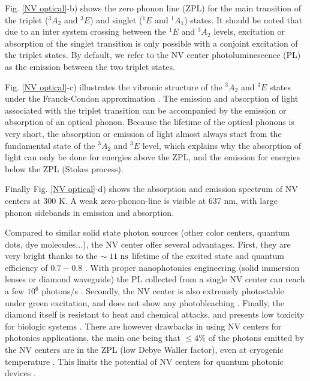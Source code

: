 \documentclass[a4paper,11pt]{report}
\begin{document}
Fig. \ref{NV optical}-b) shows the zero phonon line (ZPL) for the main transition of the triplet ($^3A_2$ and $^3E$) and singlet ($^1E$ and $^1A_1$) states. It should be noted that due to an inter system crossing between the $^1E$ and $^3A_2$ levels, excitation or absorption of the singlet transition is only possible with a conjoint excitation of the triplet states. By default, we refer to the NV center photoluminescence (PL) as the emission between the two triplet states.

Fig. \ref{NV optical}-c) illustrates the vibronic structure of the $^3A_2$ and $^3E$ states under the Franck-Condon approximation \citep{gali2011time}. The emission and absorption of light associated with the triplet transition can be accompanied by the emission or absorption of an optical phonon. Because the lifetime of the optical phonons is very short, the absorption or emission of light almost always start from the fundamental state of the $^3A_2$ and $^3E$ level, which explains why the absorption of light can only be done for energies above the ZPL, and the emission for energies below the ZPL (Stokes process).

Finally Fig. \ref{NV optical}-d) shows the absorption and emission spectrum of NV centers at 300 K. A weak zero-phonon-line is visible at 637 nm, with large phonon sidebands in emission and absorption.

\medskip
Compared to similar solid state photon sources (other color centers, quantum dots, dye molecules...), the NV center offer several advantages. First, they are very bright thanks to the $\sim 11\ \rm ns$ lifetime of the excited state and quantum efficiency of $0.7-0.8$ \citep{schirhagl2014nitrogen}. With proper nanophotonics engineering (solid immersion lenses or diamond waveguide) the PL collected from a single NV center can reach a few $10^6$ photons/s \citep{schroder2016quantum}.  Secondly, the NV center is also extremely photostable under green excitation, and does not show any photobleaching \citep{brouri2000photon}. Finally, the diamond itself is resistant to heat and chemical attacks, and presents low toxicity for biologic systems \citep{fu2007characterization}. There are however drawbacks in using NV centers for photonics applications, the main one being that $\leq 4\%$ of the photons emitted by the NV centers are in the ZPL (low Debye Waller factor), even at cryogenic temperature \citep{johnson2015tunable}. This limits the potential of NV centers for quantum photonic devices \citep{bradac2019quantum}.
\end{document}
